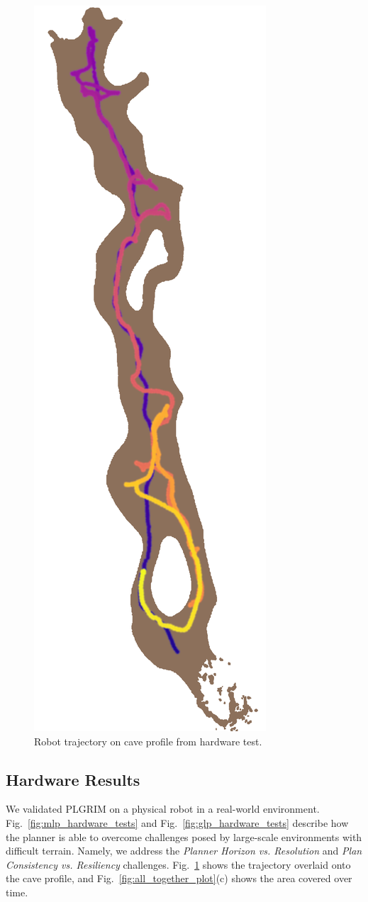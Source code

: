 \documentclass[letterpaper]{article} %
\begin{document}
\begin{figure}
     \centering
  \includegraphics[width=0.45\columnwidth,angle=90, scale=0.7
  ]{figures/darpa_tv_test_figs/cave_path_overlay_lightbrown.png}%
	\caption{Robot trajectory on cave profile from hardware test.}
    \label{fig:lava_tube_traj}
\end{figure}


\subsection{Hardware Results}
We validated PLGRIM on a physical robot in a real-world environment. Fig.~\ref{fig:mlp_hardware_tests} and Fig.~\ref{fig:glp_hardware_tests} describe how the planner is able to overcome challenges posed by large-scale environments with difficult terrain. Namely, we address the \textit{Planner Horizon vs. Resolution} and \textit{Plan Consistency vs. Resiliency} challenges. Fig.~\ref{fig:lava_tube_traj} shows the trajectory overlaid onto the cave profile, and Fig.~\ref{fig:all_together_plot}(c) shows the area covered over time.
\end{document}
